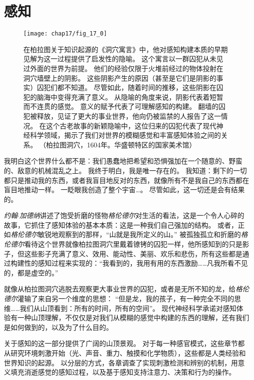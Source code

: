 \part{感知}

\begin{figure}[htbp]
	\centering
	\texttt{[image: chap17/fig\_17\_0]}
	\caption{在柏拉图关于知识起源的《洞穴寓言》中，他对感知构建本质的早期见解为这一过程提供了启发性的隐喻。
		这个寓言以一群囚犯从未见过外面的世界为前提。
		他们的经验仅限于火堆前经过的物体投射在洞穴墙壁上的阴影。
		这些阴影产生的原因（甚至是它们是阴影的事实）囚犯们都不知道。
		尽管如此，随着时间的推移，这些阴影在囚犯的脑海中变得充满了意义。
		从隐喻的角度来说，阴影代表着短暂而不连贯的感觉。
		意义的赋予代表了可理解感知的构建。
		翻墙的囚犯被释放，见证了更大的事业世界，他向仍被监禁的人报告了这一情况。
		在这个古老故事的新颖隐喻中，这位归来的囚犯代表了现代神经科学领域，揭示了我们对世界的模糊感觉和丰富感知体验之间的关系。
		（柏拉图洞穴，1604年。华盛顿特区的国家美术馆）}
	\label{fig:17_0}
\end{figure}


我明白这个世界什么都不是：我们愚蠢地把希望和恐惧强加在一个随意的、野蛮的、敌意的机械混乱之上。
我终于明白，我是唯一存在的。
我知道：剩下的一切都只是推动我的东西，或者我盲目地反对的东西，就像所有不是我自己的东西都在盲目地推动一样。
一眨眼我创造了整个宇宙…。
尽管如此，这一切还是会有结果的\cite{gardner2015grendel}。


\textit{约翰$\cdot$加德纳}讲述了饱受折磨的怪物\textit{格伦德尔}对生活的看法，这是一个令人心碎的故事，它抓住了感知体验的基本本质：这是一种我们自己强加的结构。
或者，正如\textit{格伦德尔}敏锐地观察到的那样，“山就是我所定义的山。”
被孤独孤立和折磨的\textit{格伦德尔}看待这个世界就像柏拉图洞穴里戴着镣铐的囚犯一样，他所感知到的只是影子，但这些影子充满了意义、效用、能动性、美丽、欢乐和悲伤，所有这些都是通过构建性的感知过程来实现的：“我看到的，我用有用的东西激励……凡我所看不见的，都是虚空的。”


就像从柏拉图洞穴逃脱去观察更大事业世界的囚犯，或者是无所不知的龙，给\textit{格伦德尔}灌输了来自另一个维度的思想：
“但是龙，我的孩子，有一种完全不同的思维……我们从山顶看到：所有的时间，所有的空间”。
现代神经科学承诺对感知体验有一种山顶理解，不仅仅是对我们从模糊的感觉中构建的东西的理解，还有我们是如何做到的，以及为了什么目的。


关于感知的这一部分提供了广阔的山顶景观。
对于每一种感官模式，这些章节都从研究环境刺激开始（光、声音、重力、触摸和化学物质），这些都是人类经验和世界知识的起源。
以分层的方式，各章调查了实现刺激检测和辨别的机制，用意义填充消逝感觉的感知过程，以及基于感知支持注意力、决策和行为的操作。


